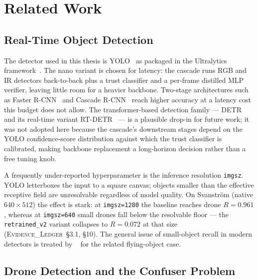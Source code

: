\chapter{Related Work}
\label{ch:literature}

\section{Real-Time Object Detection}
\label{sec:lit_objdet}

The detector used in this thesis is YOLO~\cite{redmon2016yolo} as packaged in the Ultralytics framework~\cite{ultralytics2024}. The nano variant is chosen for latency: the cascade runs RGB and IR detectors back-to-back plus a trust classifier and a per-frame distilled MLP verifier, leaving little room for a heavier backbone. Two-stage architectures such as Faster R-CNN~\cite{ren2015fasterrcnn} and Cascade R-CNN~\cite{cai2018cascade} reach higher accuracy at a latency cost this budget does not allow. The transformer-based detection family --- DETR~\cite{carion2020detr} and its real-time variant RT-DETR~\cite{zhao2024rtdetr} --- is a plausible drop-in for future work; it was not adopted here because the cascade's downstream stages depend on the YOLO confidence-score distribution against which the trust classifier is calibrated, making backbone replacement a long-horizon decision rather than a free tuning knob.

A frequently under-reported hyperparameter is the inference resolution \texttt{imgsz}. YOLO letterboxes the input to a square canvas; objects smaller than the effective receptive field are unresolvable regardless of model quality. On Svanstr\"om (native $640\times512$) the effect is stark: at \texttt{imgsz=1280} the baseline reaches drone $R=0.961$, whereas at \texttt{imgsz=640} small drones fall below the resolvable floor --- the \texttt{retrained\_v2} variant collapses to $R=0.072$ at that size (\textsc{Evidence\_Ledger}~\S3.1, \S10). The general issue of small-object recall in modern detectors is treated by \citeauthor{rozantsev2017detecting}~\cite{rozantsev2017detecting} for the related flying-object case.

\section{Drone Detection and the Confuser Problem}
\label{sec:lit_drone}


